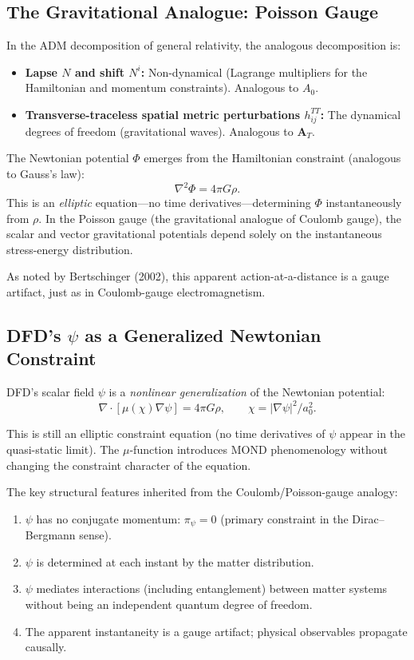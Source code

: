 \documentclass[12pt,a4paper]{article}
\begin{document}
\subsection{The Gravitational Analogue: Poisson Gauge}

In the ADM decomposition of general relativity, the analogous decomposition is:
\begin{itemize}
\item \textbf{Lapse $N$ and shift $N^i$:} Non-dynamical (Lagrange multipliers for the Hamiltonian and momentum constraints). Analogous to $A_0$.
\item \textbf{Transverse-traceless spatial metric perturbations $h_{ij}^{TT}$:} The dynamical degrees of freedom (gravitational waves). Analogous to $\mathbf{A}_T$.
\end{itemize}

The Newtonian potential $\Phi$ emerges from the Hamiltonian constraint (analogous to Gauss's law):
\begin{equation}
\nabla^2 \Phi = 4\pi G \rho.
\end{equation}
This is an \emph{elliptic} equation---no time derivatives---determining $\Phi$ instantaneously from $\rho$. In the Poisson gauge (the gravitational analogue of Coulomb gauge), the scalar and vector gravitational potentials depend solely on the instantaneous stress-energy distribution.

As noted by Bertschinger (2002), this apparent action-at-a-distance is a gauge artifact, just as in Coulomb-gauge electromagnetism.

\subsection{DFD's $\psi$ as a Generalized Newtonian Constraint}

DFD's scalar field $\psi$ is a \emph{nonlinear generalization} of the Newtonian potential:
\begin{equation}
\nabla\cdot[\mu(\chi)\nabla\psi] = 4\pi G\rho, \qquad \chi = |\nabla\psi|^2/a_0^2.
\end{equation}

This is still an elliptic constraint equation (no time derivatives of $\psi$ appear in the quasi-static limit). The $\mu$-function introduces MOND phenomenology without changing the constraint character of the equation.

The key structural features inherited from the Coulomb/Poisson-gauge analogy:
\begin{enumerate}
\item $\psi$ has no conjugate momentum: $\pi_\psi = 0$ (primary constraint in the Dirac--Bergmann sense).
\item $\psi$ is determined at each instant by the matter distribution.
\item $\psi$ mediates interactions (including entanglement) between matter systems without being an independent quantum degree of freedom.
\item The apparent instantaneity is a gauge artifact; physical observables propagate causally.
\end{enumerate}
\end{document}
